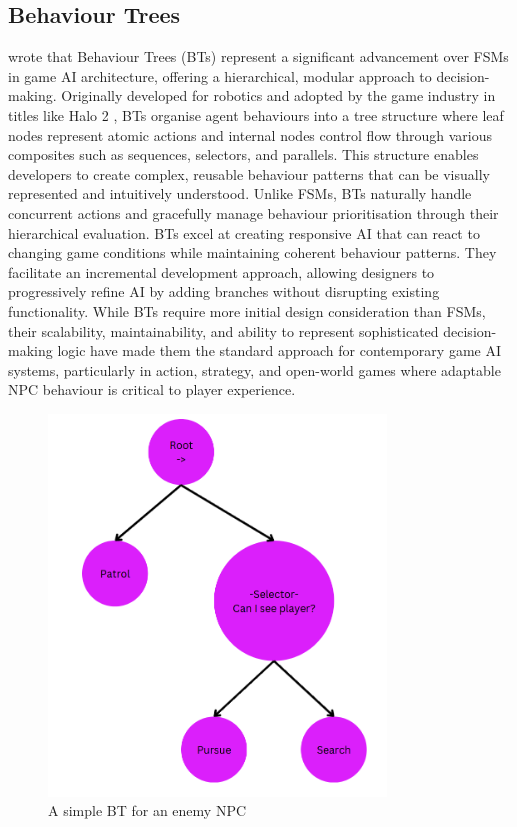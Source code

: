 \subsection{Behaviour Trees}

\cite{simpson2014behaviortrees} wrote that Behaviour Trees (BTs) represent a significant advancement over FSMs in game AI architecture, offering a hierarchical, modular approach to decision-making. 
Originally developed for robotics and adopted by the game industry in titles like Halo 2 \cite{simulacrum}, BTs organise agent behaviours into a tree structure where leaf nodes represent atomic actions and internal nodes control flow through various composites such as sequences, selectors, and parallels. 
This structure enables developers to create complex, reusable behaviour patterns that can be visually represented and intuitively understood. 
Unlike FSMs, BTs naturally handle concurrent actions and gracefully manage behaviour prioritisation through their hierarchical evaluation.
BTs excel at creating responsive AI that can react to changing game conditions while maintaining coherent behaviour patterns. 
They facilitate an incremental development approach, allowing designers to progressively refine AI by adding branches without disrupting existing functionality.
While BTs require more initial design consideration than FSMs, their scalability, maintainability, and ability to represent sophisticated decision-making logic have made them the standard approach for contemporary game AI systems, particularly in action, strategy, and open-world games where adaptable NPC behaviour is critical to player experience.

\begin{figure}[H]
    \centering
    \includegraphics[width=0.8\textwidth]{figures/bt.png}
    \caption{A simple BT for an enemy NPC}
    \label{fig:bt}
\end{figure}

